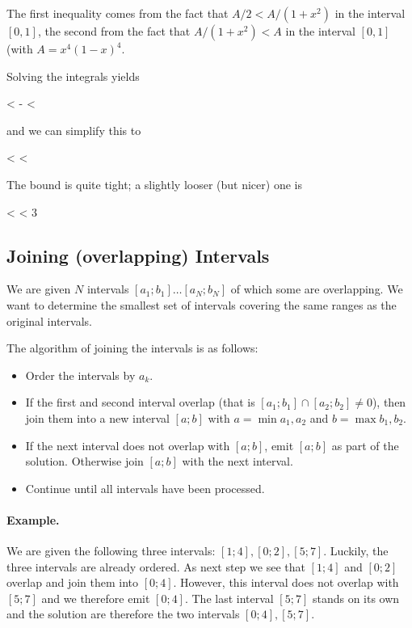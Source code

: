 The first inequality comes from the fact that $A/2 < A/(1+x^2)$ in the interval $[0,1]$, the second from the fact that $A/(1+x^2) < A$ in the interval $[0,1]$ (with $A = x^4(1-x)^4$.

Solving the integrals yields

\bee
{} <   - \pi < 
\eee

and we can simplify this to

\bee
{} < \pi < 
\eee

The bound is quite tight; a slightly looser (but nicer) one is

  < \pi < 3 
\eee

\subsection{Joining (overlapping) Intervals}

We are given $N$ intervals $[a_1; b_1] \ldots [a_N; b_N]$ of which some are overlapping. We want to determine the smallest set of intervals covering the same ranges as the original intervals.

The algorithm of joining the intervals is as follows:

\begin{itemize}
  \item Order the intervals by $a_k$.
  \item If the first and second interval overlap (that is $[a_1; b_1] \cap [a_2; b_2] \neq 0$), then join them into a new interval $[a;b]$ with $a = \min a_1, a_2$ and $b = \max b_1, b_2$.
  \item If the next interval does not overlap with $[a;b]$, emit $[a;b]$ as part of the solution. Otherwise join $[a;b]$ with the next interval.
  \item Continue until all intervals have been processed.
\end{itemize}


\paragraph{Example.} We are given the following three intervals: $[1;4], [0;2], [5;7]$. Luckily, the three intervals are already ordered. As next step we see that $[1;4]$ and $[0;2]$ overlap and join them into $[0;4]$. However, this interval does not overlap with $[5;7]$ and we therefore emit $[0;4]$. The last interval $[5;7]$ stands on its own and the solution are therefore the two intervals $[0;4], [5;7]$.


